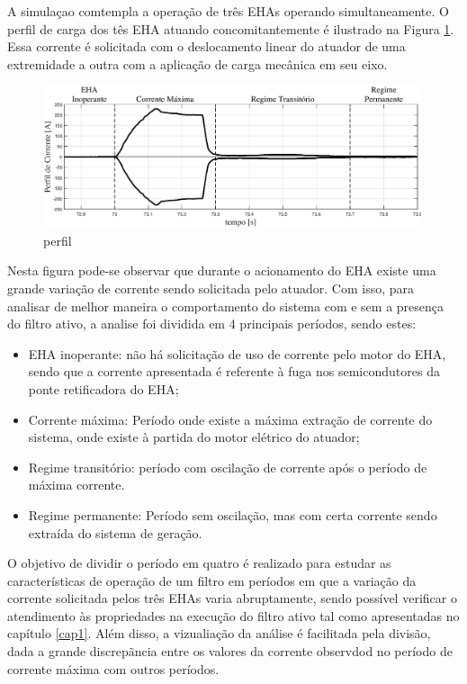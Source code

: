A simulaçao comtempla a operação de três EHAs operando simultaneamente. O perfil de carga dos tês EHA atuando concomitantemente é ilustrado na Figura \ref{fig:perfil.eps}. Essa corrente é solicitada com o deslocamento linear do atuador de uma extremidade a outra com a aplicação de carga mecânica em seu eixo.

\begin{figure}[!htb] %
	\centering
	\includegraphics[width=0.99\textwidth]{Cap4/Figuras/perfil.eps}
	\caption{perfil}
	\label{fig:perfil.eps}
\end{figure}

Nesta figura pode-se observar que durante o acionamento do EHA existe uma grande variação de corrente sendo solicitada pelo atuador. Com isso, para analisar de melhor maneira o comportamento do sistema com e sem a presença do filtro ativo, a analise foi dividida em 4 principais períodos, sendo estes:

\begin{itemize}
	\item EHA inoperante: não há solicitação de uso de corrente pelo motor do EHA, sendo que a corrente apresentada é referente à fuga nos semicondutores da ponte retificadora do EHA;
	\item Corrente máxima: Período onde existe a máxima extração de corrente do sistema, onde existe à partida do motor elétrico do atuador;
	\item Regime transitório: período com oscilação de corrente após o período de máxima corrente.
	\item Regime permanente: Período sem oscilação, mas com certa corrente sendo extraída do sistema de geração.
\end{itemize}

O objetivo de dividir o período em quatro é realizado para estudar as características de operação de um filtro em períodos em que a variação da corrente solicitada pelos três EHAs varia abruptamente, sendo possível verificar o atendimento às propriedades na execução do filtro ativo tal como apresentadas no capítulo \ref{cap1}. Além disso, a vizualiação da análise é facilitada pela divisão, dada a grande discrepãncia entre os valores da corrente observdod no período de corrente máxima com outros períodos.    

